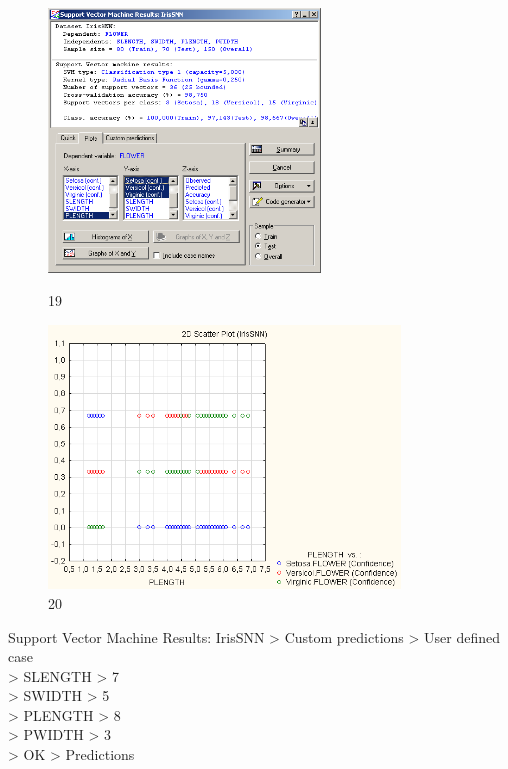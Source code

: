 \begin{figure}[!h]
  \centering

  \begin{minipage}{0.49\textwidth}
    \centering

    \includegraphics[height=7cm]
    {inc/ex_19.PNG}

    \caption{19}

    \label{fig:19}
  \end{minipage}
  \begin{minipage}{0.49\textwidth}
    \centering

    \includegraphics[height=7cm]
    {inc/ex_20.PNG}

    \caption{20}

    \label{fig:20}
  \end{minipage}
\end{figure}

Support Vector Machine Results: IrisSNN > Custom predictions > User defined case \\
> SLENGTH > 7 \\
> SWIDTH > 5 \\
> PLENGTH > 8 \\
> PWIDTH > 3 \\
> OK > Predictions

